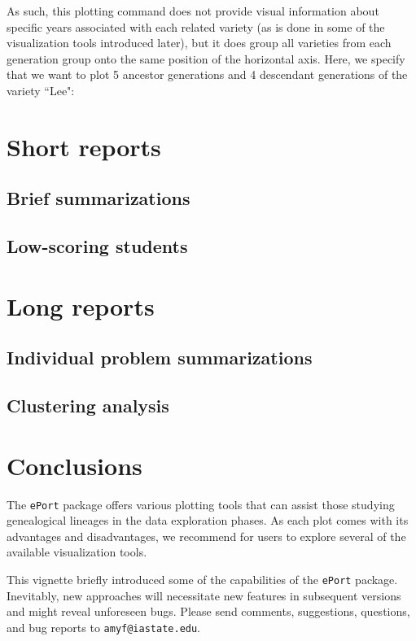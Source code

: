 \documentclass{article}\usepackage[]{graphicx}\usepackage[]{color}
\numberwithin{equation}{section} %
\newcommand{\pkg}[1]{{\texttt{#1}}}
\begin{document}
As such, this plotting command does not provide visual information about specific years associated with each related variety (as is done in some of the visualization tools introduced later), but it does group all varieties from each generation group onto the same position of the horizontal axis. Here, we specify that we want to plot 5 ancestor generations and 4 descendant generations of the variety ``Lee":

\section{Short reports}

\subsection{Brief summarizations}
\subsection{Low-scoring students}

\section{Long reports}

\subsection{Individual problem summarizations}
\subsection{Clustering analysis}

\section{Conclusions}

The \pkg{ePort} package offers various plotting tools that can assist those studying genealogical lineages in the data exploration phases. As each plot comes with its advantages and disadvantages, we recommend for users to explore several of the available visualization tools.

This vignette briefly introduced some of the capabilities of the \pkg{ePort} package. Inevitably, new approaches will necessitate new features in subsequent versions and might reveal unforeseen bugs. Please send comments, suggestions, questions, and bug reports to \texttt{amyf@iastate.edu}.
\end{document}
